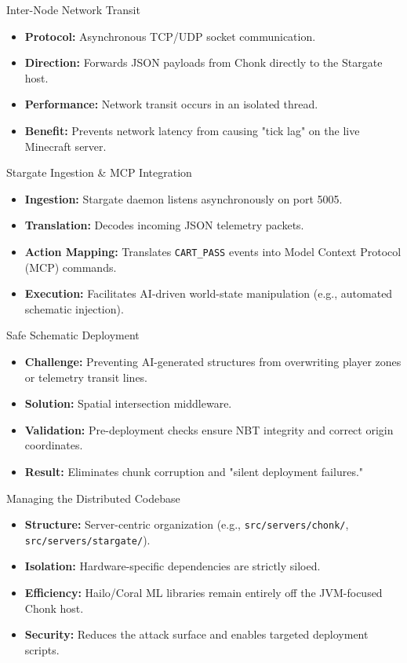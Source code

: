 \documentclass[notes]{beamer}
\begin{document}
	\begin{frame}{Inter-Node Network Transit}
		\begin{itemize}
			\item \textbf{Protocol:} Asynchronous TCP/UDP socket communication.
			\item \textbf{Direction:} Forwards JSON payloads from Chonk directly to the Stargate host.
			\item \textbf{Performance:} Network transit occurs in an isolated thread.
			\item \textbf{Benefit:} Prevents network latency from causing "tick lag" on the live Minecraft server.
		\end{itemize}
	\end{frame}
	
	\begin{frame}{Stargate Ingestion \& MCP Integration}
		\begin{itemize}
			\item \textbf{Ingestion:} Stargate daemon listens asynchronously on port 5005.
			\item \textbf{Translation:} Decodes incoming JSON telemetry packets.
			\item \textbf{Action Mapping:} Translates \texttt{CART\_PASS} events into Model Context Protocol (MCP) commands.
			\item \textbf{Execution:} Facilitates AI-driven world-state manipulation (e.g., automated schematic injection).
		\end{itemize}
	\end{frame}
	
	\begin{frame}{Safe Schematic Deployment}
		\begin{itemize}
			\item \textbf{Challenge:} Preventing AI-generated structures from overwriting player zones or telemetry transit lines.
			\item \textbf{Solution:} Spatial intersection middleware.
			\item \textbf{Validation:} Pre-deployment checks ensure NBT integrity and correct origin coordinates.
			\item \textbf{Result:} Eliminates chunk corruption and "silent deployment failures."
		\end{itemize}
	\end{frame}
	
	\begin{frame}{Managing the Distributed Codebase}
		\begin{itemize}
			\item \textbf{Structure:} Server-centric organization (e.g., \texttt{src/servers/chonk/}, \texttt{src/servers/stargate/}).
			\item \textbf{Isolation:} Hardware-specific dependencies are strictly siloed.
			\item \textbf{Efficiency:} Hailo/Coral ML libraries remain entirely off the JVM-focused Chonk host.
			\item \textbf{Security:} Reduces the attack surface and enables targeted deployment scripts.
		\end{itemize}
	\end{frame}
	
\end{document}
